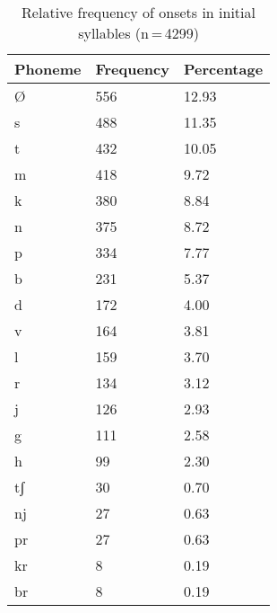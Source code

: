 \begin{table}[hp]\centering
\caption[Relative frequency of onsets in initial syllables]{Relative frequency of onsets in initial syllables (n\,=\,4299)}
\begin{tabu} to 0.5\textwidth{X X[c] X[c]}
\tableheaderfont\toprule
Phoneme
	& Frequency
	& Percentage
	\\
	
\toprule

Ø
	& 556
	& 12.93\pct
	\\

\midrule

s
	& 488
	& 11.35\pct
	\\

t
	& 432
	& 10.05\pct
	\\

m
	& 418
	& 9.72\pct
	\\

k
	& 380
	& 8.84\pct
	\\

n
	& 375
	& 8.72\pct
	\\

p
	& 334
	& 7.77\pct
	\\

b
	& 231
	& 5.37\pct
	\\

d
	& 172
	& 4.00\pct
	\\

v
	& 164
	& 3.81\pct
	\\

l
	& 159
	& 3.70\pct
	\\

r
	& 134
	& 3.12\pct
	\\

j
	& 126
	& 2.93\pct
	\\

g
	& 111
	& 2.58\pct
	\\

h
	& 99
	& 2.30\pct
	\\

tʃ
	& 30
	& 0.70\pct
	\\

nj
	& 27
	& 0.63\pct
	\\

pr
	& 27
	& 0.63\pct
	\\

kr
	& 8
	& 0.19\pct
	\\

br
	& 8
	& 0.19\pct
	\\


\end{tabu}
\end{table}
